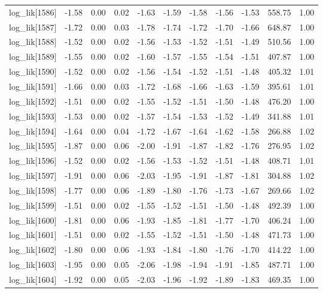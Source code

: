 \begin{table}[ht]
\begin{tabular}{rrrrrrrrrrr}
  log\_lik[1586] & -1.58 & 0.00 & 0.02 & -1.63 & -1.59 & -1.58 & -1.56 & -1.53 & 558.75 & 1.00 \\ 
  log\_lik[1587] & -1.72 & 0.00 & 0.03 & -1.78 & -1.74 & -1.72 & -1.70 & -1.66 & 648.87 & 1.00 \\ 
  log\_lik[1588] & -1.52 & 0.00 & 0.02 & -1.56 & -1.53 & -1.52 & -1.51 & -1.49 & 510.56 & 1.00 \\ 
  log\_lik[1589] & -1.55 & 0.00 & 0.02 & -1.60 & -1.57 & -1.55 & -1.54 & -1.51 & 407.87 & 1.00 \\ 
  log\_lik[1590] & -1.52 & 0.00 & 0.02 & -1.56 & -1.54 & -1.52 & -1.51 & -1.48 & 405.32 & 1.01 \\ 
  log\_lik[1591] & -1.66 & 0.00 & 0.03 & -1.72 & -1.68 & -1.66 & -1.63 & -1.59 & 395.61 & 1.01 \\ 
  log\_lik[1592] & -1.51 & 0.00 & 0.02 & -1.55 & -1.52 & -1.51 & -1.50 & -1.48 & 476.20 & 1.00 \\ 
  log\_lik[1593] & -1.53 & 0.00 & 0.02 & -1.57 & -1.54 & -1.53 & -1.52 & -1.49 & 341.88 & 1.01 \\ 
  log\_lik[1594] & -1.64 & 0.00 & 0.04 & -1.72 & -1.67 & -1.64 & -1.62 & -1.58 & 266.88 & 1.02 \\ 
  log\_lik[1595] & -1.87 & 0.00 & 0.06 & -2.00 & -1.91 & -1.87 & -1.82 & -1.76 & 276.95 & 1.02 \\ 
  log\_lik[1596] & -1.52 & 0.00 & 0.02 & -1.56 & -1.53 & -1.52 & -1.51 & -1.48 & 408.71 & 1.01 \\ 
  log\_lik[1597] & -1.91 & 0.00 & 0.06 & -2.03 & -1.95 & -1.91 & -1.87 & -1.81 & 304.88 & 1.02 \\ 
  log\_lik[1598] & -1.77 & 0.00 & 0.06 & -1.89 & -1.80 & -1.76 & -1.73 & -1.67 & 269.66 & 1.02 \\ 
  log\_lik[1599] & -1.51 & 0.00 & 0.02 & -1.55 & -1.52 & -1.51 & -1.50 & -1.48 & 492.39 & 1.00 \\ 
  log\_lik[1600] & -1.81 & 0.00 & 0.06 & -1.93 & -1.85 & -1.81 & -1.77 & -1.70 & 406.24 & 1.00 \\ 
  log\_lik[1601] & -1.51 & 0.00 & 0.02 & -1.55 & -1.52 & -1.51 & -1.50 & -1.48 & 471.73 & 1.00 \\ 
  log\_lik[1602] & -1.80 & 0.00 & 0.06 & -1.93 & -1.84 & -1.80 & -1.76 & -1.70 & 414.22 & 1.00 \\ 
  log\_lik[1603] & -1.95 & 0.00 & 0.05 & -2.06 & -1.98 & -1.94 & -1.91 & -1.85 & 487.71 & 1.00 \\ 
  log\_lik[1604] & -1.92 & 0.00 & 0.05 & -2.03 & -1.96 & -1.92 & -1.89 & -1.83 & 469.35 & 1.00 \\ 

\end{tabular}
\end{table}
